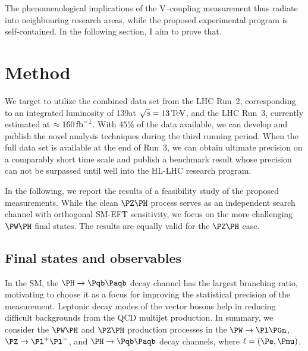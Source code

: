 \documentclass[a4paper,11pt]{article}
\newcommand{\Pb}{{{\Pqb}}\xspace}
\newcommand{\PAb}{{{{\Paqb}}}\xspace}
\renewcommand{\PV}{{{{V}}}\xspace}
\begin{document}
The phenomenological implications of the \PV--\PH coupling measurement thus radiate into neighbouring research areas, while the proposed experimental program is self-contained.
In the following section, I aim to prove that. 

\section{Method}
\label{sec:method}

We target to utilize the combined data set from the LHC Run~2, corresponding to an integrated luminosity of 139\fbinv at $\sqrt{s}=13\,\text{Te\hspace{-.08em}V}$, and the LHC Run~3, currently estimated at $\approx160\mbox{\ensuremath{\,\text{fb}^{-1}}}$.
With $45\%$ of the data available, we can develop and publish the novel analysis techniques during the third running period. 
When the full data set is available at the end of Run~3, we can obtain ultimate precision on a comparably short time scale and publish a benchmark result whose precision can not be surpassed until well into the HL-LHC research program.

In the following, we report the results of a feasibility study of the proposed measurements.
While the clean $\PZ\PH$ process serves as an independent search channel with orthogonal SM-EFT sensitivity, we focus on the more challenging $\PW\PH$ final states.
The results are equally valid for the $\PZ\PH$ case.

\subsection{Final states and observables}

In the SM, the $\PH \to \Pb \PAb$ decay channel has the largest branching ratio, motivating to choose it as a focus for improving  the statistical precision of the measurement.
Leptonic decay modes of the vector bosons help in reducing difficult backgrounds from the QCD multijet production.
In summary, we consider the $\PW\PH$ and $\PZ\PH$ production processes in the $\PW\to \Pl \Pgn$, $\PZ\to {\Pl}^{+} {\Pl}^{-}$, and $\PH \to \Pb \PAb $ decay channels, where $\ell=(\Pe, \Pmu)$.

\end{document}
